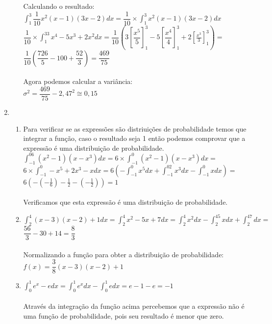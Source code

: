 \documentclass[a4paper, 12pt]{article}
\begin{document}
\begin{enumerate}
\begin{enumerate}
Calculando o resultado: \\
$\int _1^3\dfrac{1}{10}x^2\left(x-1\right)\left(3x-2\right)dx = \dfrac{1}{10}\times \int _1^3x^2\left(x-1\right)\left(3x-2\right)dx$\\
$\dfrac{1}{10}\times \int _1^33x^4-5x^3+2x^2dx = \dfrac{1}{10}(3\left[\dfrac{x^5}{5}\right]^3_1 - 5\left[\dfrac{x^4}{4}\right]^3_1 + 2\left[\frac{x^3}{3}\right]^3_1) = $ \\
$\dfrac{1}{10}(\dfrac{726}{5} - 100 + \dfrac{52}{3}) = \dfrac{469}{75}$\\ \\
Agora podemos calcular a variância: \\ 
$\sigma^2 = \dfrac{469}{75} -2,47^2 \cong 0,15$ 
\end{enumerate}
\newpage
\item \begin{enumerate}
\item Para verificar se as expressões são distriuições de probabilidade temos que integrar a função, caso o resultado seja 1  então podemos comprovar que a expressão é uma distribuição de probabilidade. \\

$\int _{-1}^06\left(x^2-1\right)\left(x-x^3\right)dx = 6 \times \int _{-1}^0\left(x^2-1\right)\left(x-x^3\right)dx =$\\
$6\times \int _{-1}^0-x^5+2x^3-xdx = 6\left(-\int _{-1}^0x^5dx+\int _{-1}^02x^3dx-\int _{-1}^0xdx\right) = $\\
$6\left(-\left(-\frac{1}{6}\right)-\frac{1}{2}-\left(-\frac{1}{2}\right)\right) =  1$\\ \\
Verificamos que esta expressão é uma distribuição de probabilidade.\\ 
\item $\int _2^4\left(x-3\right)\left(x-2\right)+1dx = \int _2^4x^2-5x+7dx = \int _2^4x^2dx-\int _2^45xdx+\int _2^47dx = $ \\
$\dfrac{56}{3}-30+14 = \dfrac{8}{3}$ \\ \\

Normalizando a função para obter a distribuição de probabilidade: \\
$f(x) = \dfrac{3}{8}(x-3)(x-2)+1$ \\

\item $\int _0^1e^x-edx = \int _0^1e^xdx-\int _0^1edx = e-1-e = -1$ \\ \\
Através da integração da função acima percebemos que a expressão não é uma função de probabilidade, pois seu resultado é menor que zero.

\end{enumerate}	
	 
\end{enumerate}

 
\end{document}
